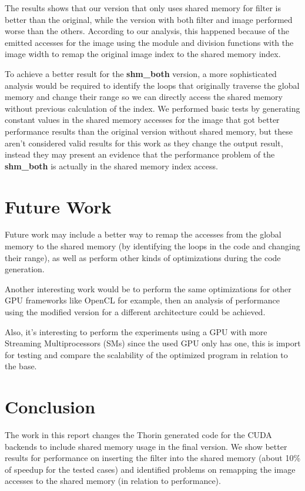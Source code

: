 \documentclass{article}
\begin{document}
The results shows that our version that only uses shared memory for filter is better than the original, while the version with both filter and image performed worse than the others. According to our analysis, this happened because of the emitted accesses for the image using the module and division functions with the image width to remap the original image index to the shared memory index.

To achieve a better result for the \textbf{shm\_both} version, a more sophisticated analysis would be required to identify the loops that originally traverse the global memory and change their range so we can directly access the shared memory without previous calculation of the index. We performed basic tests by generating constant values in the shared memory accesses for the image that got better performance results than the original version without shared memory, but these aren't considered valid results for this work as they change the output result, instead they may present an evidence that the performance problem of the \textbf{shm\_both} is actually in the shared memory index access.

\section{Future Work}
Future work may include a better way to remap the accesses from the global memory to the shared memory (by identifying the loops in the code and changing their range), as well as perform other kinds of optimizations during the code generation.

Another interesting work would be to perform the same optimizations for other GPU frameworks like OpenCL for example, then an analysis of performance using the modified version for a different architecture could be achieved.

Also, it's interesting to perform the experiments using a GPU with more Streaming Multiprocessors (SMs) since the used GPU only has one, this is import for testing and compare the scalability of the optimized program in relation to the base.

\section{Conclusion}
The work in this report changes the Thorin generated code for the CUDA backends to include shared memory usage in the final version. We show better results for performance on inserting the filter into the shared memory (about 10\% of speedup for the tested cases) and identified problems on remapping the image accesses to the shared memory (in relation to performance).
\end{document}
